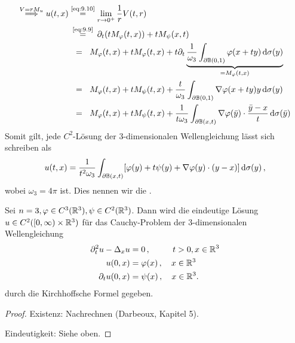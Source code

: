 \begin{align*}
	\stackrel{V=rM_u}{\Longrightarrow} u(t,x) & \stackrel{\scriptsize\eqref{eq:9.10}}= \lim_{r\rightarrow 0^+} \frac 1 r V(t,r) \\
	&\hspace{0.2em} \stackrel{\scriptsize\eqref{eq:9.9}}= \hspace{0.2em} \partial_t (tM_\varphi (t,x)) + t M_\psi (x,t) \\
	&\hspace{0.6em}  = \hspace{0.6em}M_\varphi(t,x) + tM_\varphi (t,x) + t \partial_t \underbrace{\frac 1{\omega_3} \int_{\partial\mathbb{B} (0,1)} \varphi(x+ty) \,\mathrm{d} \sigma(y)}_{=M_\varphi (t,x)} \\
	& \hspace{0.6em}=\hspace{0.6em} M_\varphi (t,x) + t M_\psi(t,x) + \frac t{\omega_3} \int_{\partial \mathbb{B}(0,1)} \nabla \varphi(x+ty) y \,\mathrm{d} \sigma(y) \\
	& \hspace{0.6em}=\hspace{0.6em} M_\varphi(t,x) + t M_\psi(t,x) + \frac 1{t\omega_3} \int_{\partial\mathbb{B}(x,t)} \nabla \varphi (\bar y) \cdot \frac{\bar y- x}t \,\mathrm{d} \sigma(\bar y)
\end{align*}
Somit gilt, jede $C^2$-Lösung der 3-dimensionalen Wellengleichung lässt sich schreiben als
\[
	u(t,x) = \frac 1{t^2\omega_3} \int_{\partial\mathbb{B} (x,t)} [\varphi(y)+t \psi(y) + \nabla \varphi(y) \cdot (y-x)] \,\mathrm{d} \sigma(y) \, ,
\]
wobei $\omega_3 = 4\pi$ ist. Dies nennen wir die .

\begin{theorem}
\label{theorem:9.6}
Sei $n=3, \varphi \in C^3(\mathbb{R}^3), \psi \in C^2(\mathbb{R}^3)$. Dann wird die eindeutige Lösung $u \in C^2([0,\infty) \times \mathbb{R}^3)$ für das Cauchy-Problem der 3-dimensionalen Wellengleichung
\begin{align*}
	\partial^2_t u - \Delta_x u &= 0 \, , \quad \qquad \! \! t >0, x \in \mathbb{R}^3 \\
	u(0,x) & = \varphi (x) \, , \quad x \in \mathbb{R}^3 \\
	\partial_t u(0,x)& = \psi(x) \, , \quad x \in \mathbb{R}^3 .
\end{align*}
durch die Kirchhoffsche Formel gegeben.
\end{theorem}

\begin{proof}
Existenz: Nachrechnen (Darbeoux, Kapitel 5).

Eindeutigkeit: Siehe oben.
\end{proof}

